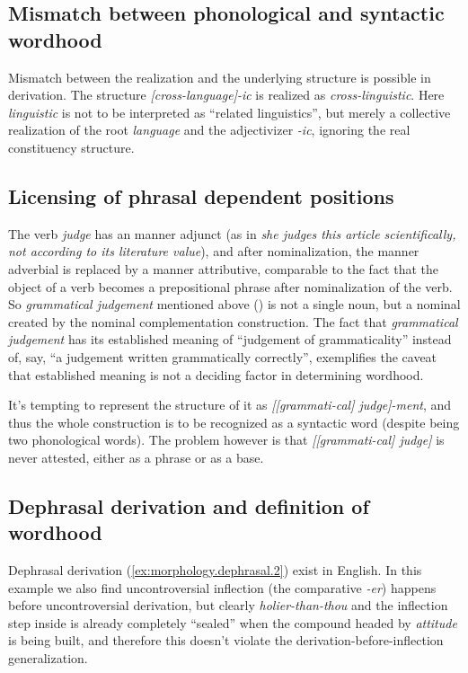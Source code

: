 \documentclass[UTF8, a4paper, oneside, scheme=plain, 12pt]{ctexbook}
\newcommand{\form}[1]{\emph{#1}}
\begin{document}
\subsection{Mismatch between phonological and syntactic wordhood}\label{sec:pos.word.mismatch}

Mismatch between the realization and the underlying structure 
is possible in derivation.
The structure \form{[cross-language]-ic} is realized as 
\form{cross-linguistic}.
Here \form{linguistic} is not to be interpreted as 
``related linguistics'',
but merely a collective realization of the root \form{language} and the adjectivizer \form{-ic},
ignoring the real constituency structure.

\subsection{Licensing of phrasal dependent positions}\label{sec:pos.word.semantics}

The verb \form{judge} has 
an manner adjunct 
(as in \form{she judges this article scientifically, 
not according to its literature value}),
and after nominalization,
the manner adverbial is 
replaced by a manner attributive,
comparable to the fact that the object of a verb 
becomes a prepositional phrase after nominalization of the verb. 
So \form{grammatical judgement} mentioned above
() is not a single noun,
but a nominal created by the nominal complementation construction.
The fact that \form{grammatical judgement} has its established meaning 
of ``judgement of grammaticality''
instead of, say, ``a judgement written grammatically correctly'',
exemplifies the caveat 
that established meaning is not a deciding factor in determining wordhood.

It's tempting to represent the structure of it as 
\form{[[grammati-cal] judge]-ment},
and thus the whole construction is to be recognized as a syntactic word
(despite being two phonological words).
The problem however is that \form{[[grammati-cal] judge]}
is never attested,
either as a phrase or as a base.

\subsection{Dephrasal derivation and definition of wordhood}\label{sec:morphology.dephrasal}

Dephrasal derivation (\ref{ex:morphology.dephrasal.2}) exist in English.
In this example we also find uncontroversial inflection (the comparative \form{-er}) happens 
before uncontroversial derivation,
but clearly \form{holier-than-thou} 
and the inflection step inside is already completely ``sealed''
when the compound headed by \form{attitude} is being built,
and therefore this doesn't violate the derivation-before-inflection generalization.
\end{document}
